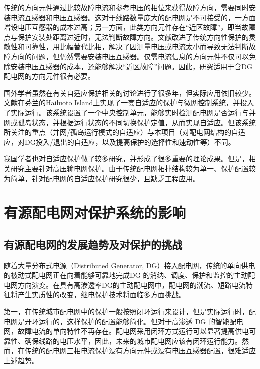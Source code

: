 传统的方向元件通过比较故障电流和参考电压的相位来获得故障方向，需要同时安装电流互感器和电压互感器。这对于线路数量庞大的配电网是不可接受的，一方面增设电压互感器的成本过高；另一方面，此类方向元件存在“近区故障”，即当故障点与保护安装处距离过近时，无法判断故障方向。文献\cite{gao2006design}改进了传统方向性保护的灵敏性和可靠性，用比幅替代比相，解决了因测量电压或电流太小而导致无法判断故障方向的问题，但仍然需要安装电压互感器。仅需电流信息的方向元件不仅可以免除安装电压互感器的成本，还能够解决“近区故障”问题\cite{pradhan2008solution}。因此，研究适用于含DG配电网的方向元件很有必要。

国外学者虽然在有关自适应保护相关的讨论进行了很多年，但实际应用依旧较少。文献\cite{laaksonen2014adaptive}在芬兰的Hailuoto Island上实现了一套自适应的保护与微网控制系统，并投入了实际运行。该系统设置了一个中央控制单元，能够实时检测配电网是否运行与并网或孤岛状态，并根据运行状态的不同切换保护定值，从而实现自适应。但该系统所关注的重点（并网/孤岛运行模式的自适应）与本项目（对配电网结构的自适应，对DG投入/退出的自适应，以及提高保护的选择性和速动性等）不同。

我国学者也对自适应保护做了较多研究，并形成了很多重要的理论成果\cite{yaozhong2007}。但是，相关研究主要针对高压输电网保护。由于传统配电网拓扑结构较为单一、保护配置较为简单，针对配电网的自适应保护研究很少，且缺乏工程应用。


\section{有源配电网对保护系统的影响}

\subsection{有源配电网的发展趋势及对保护的挑战}

随着大量分布式电源（Distributed Generator, DG）接入配电网，传统的单向供电的被动式配电网正在向着能够可靠地完成DG 的消纳、调度、保护和监控的主动配电网方向演变\cite{tianming2013,lipeng2009}。在具有高渗透率DG的主动配电网中，配电网的潮流、短路电流特征将产生实质性的改变\cite{zhang2016new,manditereza2016,huang2016diagnostic}，继电保护技术将面临多方面挑战。

第一，在传统城市配电网中的保护一般按照闭环运行来设计，但是实际运行时，配电网是开环运行的，这样保护的配置能够简化。但对于高渗透 DG 的智能配电网，故障电流的单向特性不再存在。配电网采用闭环方式运行可以显著提高供电可靠性、确保线路的电压水平，因此，未来的城市配电网应该有闭环运行能力。然而，在传统的配电网三相电流保护没有方向元件或没有电压互感器配置，很难适应上述趋势。


